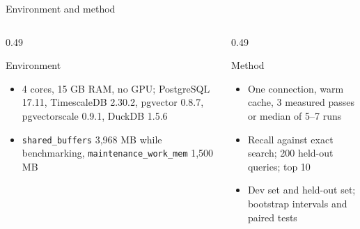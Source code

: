 \documentclass[aspectratio=169,10pt]{beamer}
\newcommand{\code}[1]{\texttt{\footnotesize #1}}
\newcommand{\terminal}[1]{}
\begin{document}
\begin{frame}{Environment and method}
\begin{columns}[T]
\begin{column}{0.49\textwidth}
\begin{block}{Environment}
\begin{itemize}
  \item 4 cores, 15 GB RAM, no GPU; PostgreSQL 17.11, TimescaleDB 2.30.2, pgvector 0.8.7, pgvectorscale 0.9.1, DuckDB 1.5.6
  \item \code{shared\_buffers} 3,968 MB while benchmarking, \code{maintenance\_work\_mem} 1,500 MB
\end{itemize}
\end{block}
\end{column}
\begin{column}{0.49\textwidth}
\begin{block}{Method}
\begin{itemize}
  \item One connection, warm cache, 3 measured passes or median of 5--7 runs
  \item Recall against exact search; 200 held-out queries; top 10
  \item Dev set and held-out set; bootstrap intervals and paired tests
\end{itemize}
\end{block}
\end{column}
\end{columns}
\vspace{0.3em}
\terminal{term-config}
\end{frame}
\end{document}
